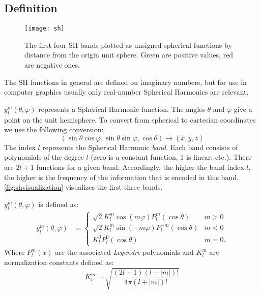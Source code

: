 \documentclass[thesis.tex]{subfiles}
\begin{document}
\subsection{Definition} \label{chap:sh:def}
\begin{figure}[h]
	\centering
	\texttt{[image: sh]}
	\caption{\cite{bib:guerrero:thesis} The first four SH bands plotted as unsigned spherical functions by distance from the origin unit sphere. Green are positive values, red are negative ones.}
	\label{fig:shvisualization}
\end{figure}
The SH functions in general are defined on imaginary numbers, but for use in computer graphics usually only real-number Spherical Harmonics are relevant.

$y^m_l(\theta, \varphi)$ represents a Spherical Harmonic function.
The angles $\theta$ and $\varphi$ give a point on the unit hemisphere.
To convert from spherical to cartesian coordinates we use the following conversion:
\begin{equation} \label{equ:postoangle}
(\sin\theta\cos\varphi, \sin\theta\sin\varphi, \cos\theta) \rightarrow (x,y,z)
\end{equation}
The index $l$ represents the Spherical Harmonic \emph{band}.
Each band consists of polynomials of the degree $l$ (zero is a constant function, 1 is linear, etc.).
There are $2l+1$ functions for a given band.
Accordingly, the higher the band index $l$, the higher is the frequency of the information that is encoded in this band.
\autoref{fig:shvisualization} visualizes the first three bands.

$y^m_l(\theta, \varphi)$ is defined as:
\begin{equation}
	\begin{alignedat}{2}
		y^m_l(\theta, \varphi) &= \begin{cases}
		\sqrt{2}K^m_l \cos(m\varphi) P^m_l(\cos\theta) & m>0\\
		\sqrt{2}K^m_l \sin(-m\varphi) P^{-m}_l(\cos\theta) & m<0\\
		K^0_l P^0_l(\cos\theta) & m=0.\end{cases}
	\end{alignedat}
\end{equation}
Where $P^m_l(x)$ are the associated \emph{Legendre} polynomials and $K^m_l$ are normalization constants defined as:
\begin{equation}
	K^m_l = \sqrt{\frac{(2l+1)(l-|m|)!}{4\pi(l+|m|)!}}
\end{equation}
\end{document}
